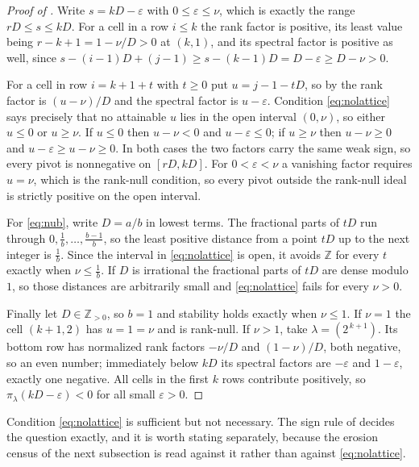\documentclass[11pt,letterpaper]{article}
\newcommand{\Zint}{\mathbb{Z}}
\begin{document}
\begin{proof}[Proof of ]
Write $s=kD-\varepsilon$ with $0\le\varepsilon\le\nu$, which is exactly the range
$rD\le s\le kD$. For a cell in a row $i\le k$ the rank factor is positive, its
least value being $r-k+1=1-\nu/D>0$ at $(k,1)$, and its spectral factor is
positive as well, since $s-(i-1)D+(j-1)\ge s-(k-1)D=D-\varepsilon\ge D-\nu>0$.

For a cell in row $i=k+1+t$ with $t\ge0$ put $u=j-1-tD$, so by 
the rank factor is $(u-\nu)/D$ and the spectral factor is $u-\varepsilon$.
Condition \eqref{eq:nolattice} says precisely that no attainable $u$ lies in the
open interval $(0,\nu)$, so either $u\le0$ or $u\ge\nu$. If $u\le0$ then
$u-\nu<0$ and $u-\varepsilon\le0$; if $u\ge\nu$ then $u-\nu\ge0$ and
$u-\varepsilon\ge u-\nu\ge0$. In both cases the two factors carry the same weak
sign, so every pivot is nonnegative on $[rD,kD]$. For $0<\varepsilon<\nu$ a
vanishing factor requires $u=\nu$, which is the rank-null condition, so every
pivot outside the rank-null ideal is strictly positive on the open interval.

For \eqref{eq:nub}, write $D=a/b$ in lowest terms. The fractional parts of $tD$
run through $0,\tfrac1b,\dots,\tfrac{b-1}{b}$, so the least positive distance
from a point $tD$ up to the next integer is $\tfrac1b$. Since the interval in
\eqref{eq:nolattice} is open, it avoids $\Zint$ for every $t$ exactly when
$\nu\le\tfrac1b$. If $D$ is irrational the fractional parts of $tD$ are dense
modulo $1$, so those distances are arbitrarily small and \eqref{eq:nolattice}
fails for every $\nu>0$.

Finally let $D\in\Zint_{>0}$, so $b=1$ and stability holds exactly when
$\nu\le1$. If $\nu=1$ the cell $(k+1,2)$ has $u=1=\nu$ and is rank-null. If
$\nu>1$, take $\lambda=(2^{\,k+1})$. Its bottom row has normalized rank factors
$-\nu/D$ and $(1-\nu)/D$, both negative, so an even number; immediately below $kD$ its
spectral factors are $-\varepsilon$ and $1-\varepsilon$, exactly one negative.
All cells in the first $k$ rows contribute positively, so
$\pi_\lambda(kD-\varepsilon)<0$ for all small $\varepsilon>0$.
\end{proof}

Condition \eqref{eq:nolattice} is sufficient but not necessary. The sign rule of
 decides the question exactly, and it is worth stating separately,
because the erosion census of the next subsection is read against it rather than
against \eqref{eq:nolattice}.
\end{document}
